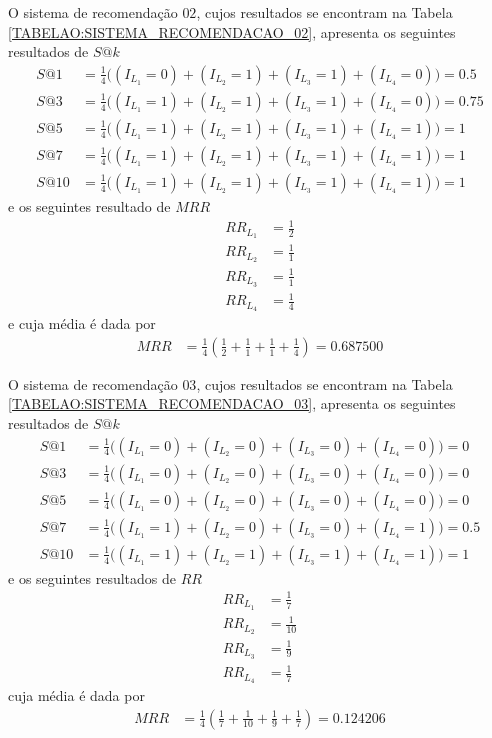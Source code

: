 O sistema de recomendação \(02\), cujos resultados se encontram na Tabela \ref{TABELAO:SISTEMA_RECOMENDACAO_02}, apresenta os seguintes resultados de \(S@k\)
\begin{align}
S@1 &= \frac{1}{4}  \Big( (I_{L_{1}} = 0) + (I_{L_{2}} = 1) + (I_{L_{3}} = 1) + (I_{L_{4}} = 0) \Big) =	0.5		\\
S@3 &= \frac{1}{4}  \Big( (I_{L_{1}} = 1) + (I_{L_{2}} = 1) + (I_{L_{3}} = 1) + (I_{L_{4}} = 0) \Big) =	0.75	\\
S@5 &= \frac{1}{4}  \Big( (I_{L_{1}} = 1) + (I_{L_{2}} = 1) + (I_{L_{3}} = 1) + (I_{L_{4}} = 1) \Big) =	1		\\
S@7 &= \frac{1}{4}  \Big( (I_{L_{1}} = 1) + (I_{L_{2}} = 1) + (I_{L_{3}} = 1) + (I_{L_{4}} = 1) \Big) =	1		\\
S@10 &= \frac{1}{4} \Big( (I_{L_{1}} = 1) + (I_{L_{2}} = 1) + (I_{L_{3}} = 1) + (I_{L_{4}} = 1) \Big) =	1		
\end{align}
e os seguintes resultado de \(MRR\)
\begin{align}
RR_{L_{1}} &= \frac{1}{2}		\\
RR_{L_{2}} &= \frac{1}{1}		\\
RR_{L_{3}} &= \frac{1}{1}		\\
RR_{L_{4}} &= \frac{1}{4}		
\end{align}
e cuja média é dada por 
\begin{align}
MRR &= \frac{1}{4} \left( \frac{1}{2} + \frac{1}{1} + \frac{1}{1} + \frac{1}{4} \right) = 0.687500
\end{align}

O sistema de recomendação \(03\), cujos resultados se encontram na Tabela \ref{TABELAO:SISTEMA_RECOMENDACAO_03}, apresenta os seguintes resultados de \(S@k\)
\begin{align}
S@1 &= \frac{1}{4}  \Big( (I_{L_{1}} = 0) + (I_{L_{2}} = 0) + (I_{L_{3}} = 0) + (I_{L_{4}} = 0) \Big) =	0		\\
S@3 &= \frac{1}{4}  \Big( (I_{L_{1}} = 0) + (I_{L_{2}} = 0) + (I_{L_{3}} = 0) + (I_{L_{4}} = 0) \Big) =	0		\\
S@5 &= \frac{1}{4}  \Big( (I_{L_{1}} = 0) + (I_{L_{2}} = 0) + (I_{L_{3}} = 0) + (I_{L_{4}} = 0) \Big) =	0		\\
S@7 &= \frac{1}{4}  \Big( (I_{L_{1}} = 1) + (I_{L_{2}} = 0) + (I_{L_{3}} = 0) + (I_{L_{4}} = 1) \Big) =	0.5		\\
S@10 &= \frac{1}{4} \Big( (I_{L_{1}} = 1) + (I_{L_{2}} = 1) + (I_{L_{3}} = 1) + (I_{L_{4}} = 1) \Big) =	1		
\end{align}
e os seguintes resultados de \(RR\)
\begin{align}
RR_{L_{1}} &= \frac{1}{7}		\\
RR_{L_{2}} &= \frac{1}{10}		\\
RR_{L_{3}} &= \frac{1}{9}		\\
RR_{L_{4}} &= \frac{1}{7}		
\end{align}
cuja média é dada por
\begin{align}
MRR &= \frac{1}{4} \left( \frac{1}{7} + \frac{1}{10} + \frac{1}{9} + \frac{1}{7} \right) = 0.124206
\end{align}

